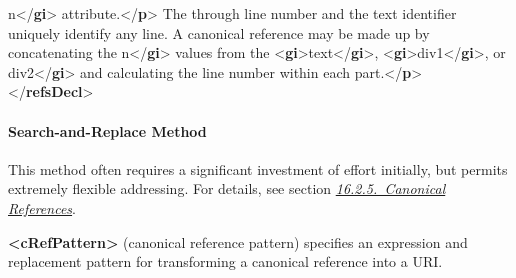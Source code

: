 \begin{shaded}
n{</\textbf{gi}>} attribute.{</\textbf{p}>}\mbox{}\newline 
{}The through line number and the text identifier uniquely identify\mbox{}\newline 
\hspace*{1em}\hspace*{1em} any line. A canonical reference may be made up by concatenating the\mbox{}\newline 
{}n{</\textbf{gi}>} values from the {<\textbf{gi}>}text{</\textbf{gi}>}, {<\textbf{gi}>}div1{</\textbf{gi}>}, or\mbox{}\newline 
{}div2{</\textbf{gi}>} and calculating the line number within each part.{</\textbf{p}>}\mbox{}\newline 
{</\textbf{refsDecl}>}\end{shaded}\egroup\par 
\paragraph[{Search-and-Replace Method}]{Search-and-Replace Method}\label{HD54S}\par
This method often requires a significant investment of effort initially, but permits extremely flexible addressing. For details, see section \textit{\hyperref[SACR]{16.2.5.\ Canonical References}}.  
\begin{sansreflist}
  
\item [\textbf{<cRefPattern>}] (canonical reference pattern) specifies an expression and replacement pattern for transforming a canonical reference into a URI.
\end{sansreflist}

